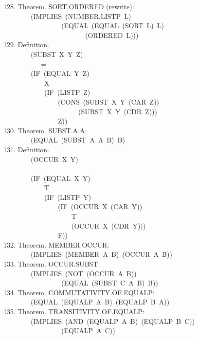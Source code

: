 \documentclass[10pt]{book}
\newenvironment{pubasis}{\begin{flushleft}}{\end{flushleft}}
\begin{document}
\begin{pubasis}
128.    Theorem.  SORT.ORDERED (rewrite):\\
~~~~~~~~(IMPLIES~(NUMBER.LISTP~L)\\
~~~~~~~~~~~~~~~~~(EQUAL~(EQUAL~(SORT~L)~L)\\
~~~~~~~~~~~~~~~~~~~~~~~~(ORDERED~L)))\\

129.    Definition.\\
~~~~~~~~(SUBST~X~Y~Z)\\
~~~~~~~~~~~=\\
~~~~~~~~(IF~(EQUAL~Y~Z)\\
~~~~~~~~~~~~X\\
~~~~~~~~~~~~(IF~(LISTP~Z)\\
~~~~~~~~~~~~~~~~(CONS~(SUBST~X~Y~(CAR~Z))\\
~~~~~~~~~~~~~~~~~~~~~~(SUBST~X~Y~(CDR~Z)))\\
~~~~~~~~~~~~~~~~Z))\\

130.    Theorem.  SUBST.A.A:\\
~~~~~~~~(EQUAL~(SUBST~A~A~B)~B)\\

131.    Definition.\\
~~~~~~~~(OCCUR~X~Y)\\
~~~~~~~~~~~=\\
~~~~~~~~(IF~(EQUAL~X~Y)\\
~~~~~~~~~~~~T\\
~~~~~~~~~~~~(IF~(LISTP~Y)\\
~~~~~~~~~~~~~~~~(IF~(OCCUR~X~(CAR~Y))\\
~~~~~~~~~~~~~~~~~~~~T\\
~~~~~~~~~~~~~~~~~~~~(OCCUR~X~(CDR~Y)))\\
~~~~~~~~~~~~~~~~F))\\

132.    Theorem.  MEMBER.OCCUR:\\
~~~~~~~~(IMPLIES~(MEMBER~A~B)~(OCCUR~A~B))\\

133.    Theorem.  OCCUR.SUBST:\\
~~~~~~~~(IMPLIES~(NOT~(OCCUR~A~B))\\
~~~~~~~~~~~~~~~~~(EQUAL~(SUBST~C~A~B)~B))\\

134.    Theorem.  COMMUTATIVITY.OF.EQUALP:\\
~~~~~~~~(EQUAL~(EQUALP~A~B)~(EQUALP~B~A))\\

135.    Theorem.  TRANSITIVITY.OF.EQUALP:\\
~~~~~~~~(IMPLIES~(AND~(EQUALP~A~B)~(EQUALP~B~C))\\
~~~~~~~~~~~~~~~~~(EQUALP~A~C))\\


\end{pubasis}
\end{document}
